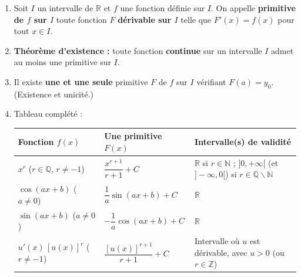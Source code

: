 \documentclass[11pt]{article}
\def\setminus{\mathbin{\backslash}}\let\smallsetminus\setminus
\begin{document}
\begin{corrige}
\begin{enumerate}
\item Soit $I$ un intervalle de $\mathbb{R}$ et $f$ une fonction définie sur $I$. On appelle \textbf{primitive de $f$ sur $I$} toute fonction $F$ \textbf{dérivable sur $I$} telle que $F'(x) = f(x)$ pour tout $x \in I$.
\item \textbf{Théorème d'existence :} toute fonction \textbf{continue} sur un intervalle $I$ admet au moins une primitive sur $I$.
\item Il existe \textbf{une et une seule} primitive $F$ de $f$ sur $I$ vérifiant $F(a) = y_0$. (Existence et unicité.)
\item Tableau complété :
\begin{center}
\begin{tabularx}{\linewidth}{|X|X|X|}
\hline
\rowcolor{popblueL}
\textbf{Fonction $f(x)$} & \textbf{Une primitive $F(x)$} & \textbf{Intervalle(s) de validité} \\
\hline
$x^r$ ($r \in \mathbb{Q}$, $r \neq -1$) & $\dfrac{x^{r+1}}{r+1} + C$ & $\mathbb{R}$ si $r \in \mathbb{N}$ ; $]0,+\infty[$ (et $]-\infty,0[$) si $r \in \mathbb{Q} \setminus \mathbb{N}$ \\
\hline
$\cos(ax+b)$ ($a \neq 0$) & $\dfrac{1}{a}\sin(ax+b) + C$ & $\mathbb{R}$ \\
\hline
$\sin(ax+b)$ ($a \neq 0$) & $-\dfrac{1}{a}\cos(ax+b) + C$ & $\mathbb{R}$ \\
\hline
$u'(x)\,[u(x)]^r$ ($r \neq -1$) & $\dfrac{[u(x)]^{r+1}}{r+1} + C$ & Intervalle où $u$ est dérivable, avec $u > 0$ (ou $r \in \mathbb{Z}$) \\
\hline
\end{tabularx}
\end{center}
\end{enumerate}
\end{corrige}
\end{document}
